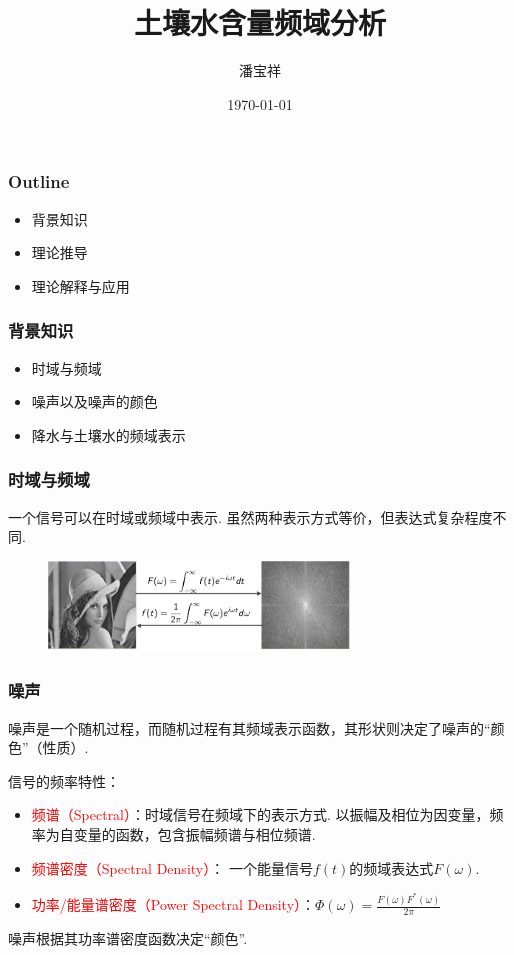 \documentclass{beamer}
\begin{document}
\begin{CJK}{UTF8}{gkai}
\title{土壤水含量频域分析}
\date{\today}
\author{潘宝祥}
\maketitle

\begin{frame}
\frametitle{Outline}
\begin{itemize}
\item 背景知识
\item 理论推导
\item 理论解释与应用
\end{itemize}
\end{frame}



\begin{frame}
\frametitle{背景知识}
\begin{itemize}
\item 时域与频域
\item 噪声以及噪声的颜色
\item 降水与土壤水的频域表示
\end{itemize}
\end{frame}

\begin{frame}
\frametitle{时域与频域}
一个信号可以在时域或频域中表示. 虽然两种表示方式等价，但表达式复杂程度不同.
\begin{figure}[H]
\centering
\includegraphics[width=8cm]{fourier.png}
\end{figure}
 
\end{frame}

\begin{frame}
\frametitle{噪声}
噪声是一个随机过程，而随机过程有其频域表示函数，其形状则决定了噪声的``颜色''（性质）.

信号的频率特性：
\begin{itemize}
\item \textcolor{red}{频谱（Spectral）}：时域信号在频域下的表示方式. 以振幅及相位为因变量，频率为自变量的函数，包含振幅频谱与相位频谱.
\item \textcolor{red}{频谱密度（Spectral Density）}： 一个能量信号$f(t)$的频域表达式$F(\omega)$.
\item \textcolor{red}{功率/能量谱密度（Power Spectral Density）}：$\Phi(\omega)=\frac{F(\omega)F^*(\omega)}{2\pi}$
\end{itemize}
噪声根据其功率谱密度函数决定``颜色''.
\end{frame}


\end{CJK}
\end{document}

